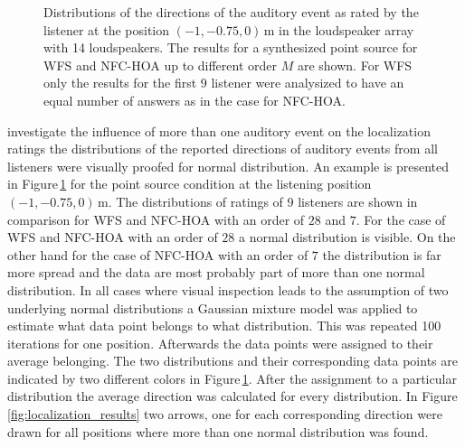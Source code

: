 \begin{figure}
    \small
    \centering
    
    \caption{Distributions of the directions of the auditory event as rated by
    the listener at the position $(-1,-0.75,0)$\,m in the loudspeaker array with
    14 loudspeakers. The results for a synthesized point source for \ac{WFS} and
    \ac{NFC-HOA} up to different order $M$ are shown. For \ac{WFS} only the
    results for the first 9 listener were analysized to have an equal number of
    answers as in the case for \ac{NFC-HOA}.
    }
    \label{fig:localization_distribution}
\end{figure}
%
 investigate the influence of more than one auditory event on the
localization ratings the distributions of the reported directions of auditory
events from all listeners were visually proofed for normal distribution. An
example is presented in Figure\,\ref{fig:localization_distribution} for the point
source condition at the listening position $(-1,-0.75,0)$\,m. The distributions
of ratings of 9 listeners are shown in comparison for \ac{WFS} and \ac{NFC-HOA}
with an order of $28$ and $7$. For the case of \ac{WFS} and \ac{NFC-HOA} with an
order of $28$ a normal distribution is visible. On the other hand for the case
of \ac{NFC-HOA} with an order of $7$ the distribution is far more spread and the
data are most probably part of more than one normal distribution. In all
cases where visual inspection leads to the assumption of two underlying normal
distributions a Gaussian mixture model was applied to estimate what data point
belongs to what distribution. This was repeated 100 iterations for one
position. Afterwards the data points were assigned to their average
belonging. The two distributions and their corresponding data points are
indicated by two different colors in
Figure\,\ref{fig:localization_distribution}. After the assignment to a particular
distribution the average direction was calculated for every distribution. In
Figure\,\ref{fig:localization_results} two arrows, one for each corresponding
direction were drawn for all positions where more than one normal distribution
was found.


